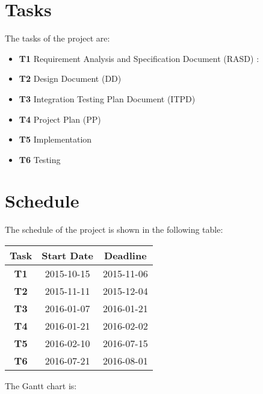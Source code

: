 \section{Tasks}
The tasks of the project are:

\begin{itemize}
	
	\item\textbf{T1} Requirement Analysis and Specification Document (RASD) : 
	
	\item\textbf{T2} Design Document (DD)
	
	\item\textbf{T3} Integration Testing Plan Document (ITPD)
	
	\item\textbf{T4} Project Plan (PP)
	
	\item\textbf{T5} Implementation
	
	\item\textbf{T6} Testing 
	
\end{itemize}



\section{Schedule}

The schedule of the project is shown in the following table:


\begin{table}[h]
	\centering
	\begin{tabular}{| c | c | c |}
		\hline
		 Task & Start Date & Deadline  \\ \hline
		\textbf{T1} & 2015-10-15  & 2015-11-06 \\ \hline
		\textbf{T2} & 2015-11-11 & 2015-12-04 \\ \hline
		\textbf{T3} & 2016-01-07 & 2016-01-21 \\ \hline
		\textbf{T4} & 2016-01-21 & 2016-02-02 \\ \hline
		\textbf{T5} & 2016-02-10 & 2016-07-15 \\ \hline
		\textbf{T6} & 2016-07-21 & 2016-08-01 \\ \hline
	\end{tabular}
\end{table}
\newpage
The Gantt chart is: 


